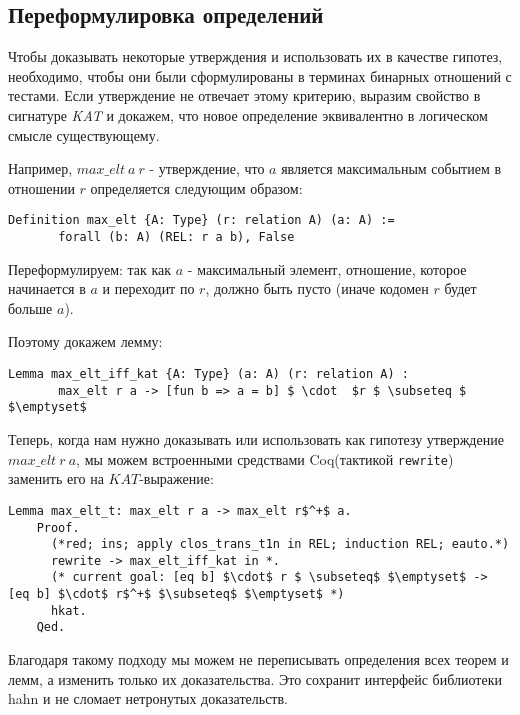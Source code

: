 \documentclass[times
              ]{itmo-student-thesis}
\begin{document}
    \subsection{Переформулировка определений}
   Чтобы доказывать некоторые утверждения и использовать их в качестве гипотез, необходимо, чтобы они были сформулированы в терминах бинарных отношений с тестами.
   Если утверждение не отвечает этому критерию, выразим свойство в сигнатуре \textit{KAT} и докажем, что новое определение эквивалентно в логическом смысле существующему.

   Например, $max\_elt\ a\ r$ - утверждение, что $a$ является максимальным событием в отношении $r$ определяется следующим образом:
   \begin{lstlisting}[mathescape=true, language=coq]
     Definition max_elt {A: Type} (r: relation A) (a: A) :=
       forall (b: A) (REL: r a b), False
   \end{lstlisting}

   Переформулируем: так как $ a $ - максимальный элемент, отношение, которое начинается в $ a $ и переходит по $ r $, должно быть пусто (иначе кодомен $ r $ будет больше $ a $).

   Поэтому докажем лемму:
   \begin{lstlisting}[mathescape=true, language=coq]
     Lemma max_elt_iff_kat {A: Type} (a: A) (r: relation A) :
       max_elt r a -> [fun b => a = b] $ \cdot  $r $ \subseteq $ $\emptyset$
   \end{lstlisting}

    Теперь, когда нам нужно доказывать или использовать как гипотезу утверждение $ max\_elt\ r\ a $,
    мы можем встроенными средствами Coq(тактикой \lstinline[language=coq]{rewrite}) заменить его на $ KAT $-выражение:

    \begin{lstlisting}[language=coq, mathescape=true]
    Lemma max_elt_t: max_elt r a -> max_elt r$^+$ a.
    Proof.
      (*red; ins; apply clos_trans_t1n in REL; induction REL; eauto.*)
      rewrite -> max_elt_iff_kat in *.
      (* current goal: [eq b] $\cdot$ r $ \subseteq$ $\emptyset$ -> [eq b] $\cdot$ r$^+$ $\subseteq$ $\emptyset$ *)
      hkat.
    Qed.
    \end{lstlisting}

    Благодаря такому подходу мы можем не переписывать определения всех теорем и лемм, а изменить только их доказательства.
    Это сохранит интерфейс библиотеки hahn и не сломает нетронутых доказательств.
\end{document}
